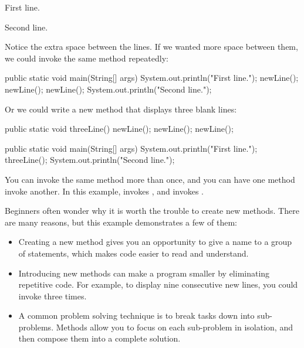\begin{stdout}
First line.

Second line.
\end{stdout}

Notice the extra space between the lines.
If we wanted more space between them, we could invoke the same method repeatedly:

\begin{code}
public static void main(String[] args) {
    System.out.println("First line.");
    newLine();
    newLine();
    newLine();
    System.out.println("Second line.");
}
\end{code}

Or we could write a new method that displays three blank lines:

\begin{code}
public static void threeLine() {
    newLine();
    newLine();
    newLine();
}

public static void main(String[] args) {
    System.out.println("First line.");
    threeLine();
    System.out.println("Second line.");
}
\end{code}

You can invoke the same method more than once, and you can have one method invoke another.
In this example,  invokes , and  invokes .

Beginners often wonder why it is worth the trouble to create new methods.
There are many reasons, but this example demonstrates a few of them:

\begin{itemize}

\item Creating a new method gives you an opportunity to give a name to a group of statements, which makes code easier to read and understand.

\item Introducing new methods can make a program smaller by eliminating repetitive code.
For example, to display nine consecutive new lines, you could invoke  three times.

\item A common problem solving technique is to break tasks down into sub-problems.
Methods allow you to focus on each sub-problem in isolation, and then compose them into a complete solution.

\end{itemize}

